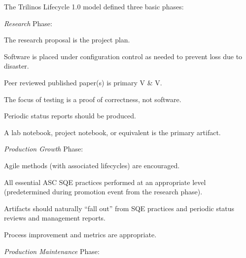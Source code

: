 \documentclass[11pt]{SANDreport}
\begin{document}
The Trilinos Lifecycle 1.0 model defined three basic phases:

\begin{compactitem}

{}\item\textit{Research} Phase:

  \begin{compactitem}

  {}\item The research proposal is the project plan.

  {}\item Software is placed under configuration control as needed to
  prevent loss due to disaster.

  {}\item Peer reviewed published paper(s) is primary V \& V.

  {}\item The focus of testing is a proof of correctness, not
  software.

  {}\item Periodic status reports should be produced.

  {}\item A lab notebook, project notebook, or equivalent is the
  primary artifact.
  
  \end{compactitem}

{}\item\textit{Production Growth} Phase:

  \begin{compactitem}

  {}\item Agile methods (with associated lifecycles) are encouraged.

  {}\item All essential ASC SQE practices performed at an appropriate
  level (predetermined during promotion event from the research
  phase).

  {}\item Artifacts should naturally ``fall out'' from SQE practices
  and periodic status reviews and management reports.

  {}\item Process improvement and metrics are appropriate.
  
  \end{compactitem}

{}\item\textit{Production Maintenance} Phase:


\end{compactitem}
\end{document}
